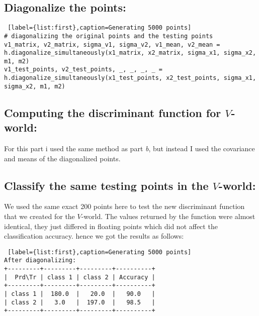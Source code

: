 \documentclass[11pt, oneside]{article}   	%
\begin{document}
\subsection{Diagonalize the points:}
\begin{lstlisting} [label={list:first},caption=Generating 5000 points]
# diagonalizing the original points and the testing points
v1_matrix, v2_matrix, sigma_v1, sigma_v2, v1_mean, v2_mean = h.diagonalize_simultaneously(x1_matrix, x2_matrix, sigma_x1, sigma_x2, m1, m2)
v1_test_points, v2_test_points, _, _, _, _ = h.diagonalize_simultaneously(x1_test_points, x2_test_points, sigma_x1, sigma_x2, m1, m2)
\end{lstlisting}

\subsection{Computing the discriminant function for $V$-world:}
For this part i used the same method as part \textit{b}, but instead I used the covariance and means of the diagonalized points.

\subsection{Classify the same testing points in the $V$-world:}
We used the same exact 200 points here to test the new discriminant function that we created for the $V$-world. The values returned by the function were almost identical, they just differed in floating points which did not affect the classification accuracy. hence we got the results as follows:
\begin{lstlisting} [label={list:first},caption=Generating 5000 points]
After diagonalizing:
+---------+---------+---------+----------+
|  Prd\Tr | class 1 | class 2 | Accuracy |
+---------+---------+---------+----------+
| class 1 |  180.0  |   20.0  |   90.0   |
| class 2 |   3.0   |  197.0  |   98.5   |
+---------+---------+---------+----------+

\end{lstlisting}
\end{document}
